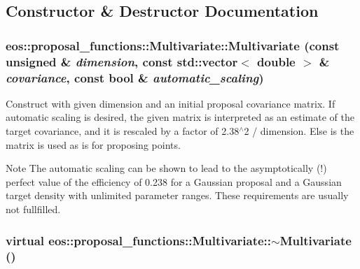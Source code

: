 \subsection{Constructor \& Destructor Documentation}
\hypertarget{classeos_1_1proposal__functions_1_1Multivariate_a0f3a2171c1b20ef0f4cb4588185981aa}{
\subsubsection[{Multivariate}]{\setlength{\rightskip}{0pt plus 5cm}eos::proposal\_\-functions::Multivariate::Multivariate (const unsigned \& {\em dimension}, \/  const std::vector$<$ double $>$ \& {\em covariance}, \/  const bool \& {\em automatic\_\-scaling})}}
\label{classeos_1_1proposal__functions_1_1Multivariate_a0f3a2171c1b20ef0f4cb4588185981aa}
Construct with given dimension and an initial proposal covariance matrix. If automatic scaling is desired, the given matrix is interpreted as an estimate of the target covariance, and it is rescaled by a factor of 2.38$^\wedge$2 / dimension. Else is the matrix is used as is for proposing points.

\begin{DoxyNote}{Note}
The automatic scaling can be shown to lead to the asymptotically (!) perfect value of the efficiency of 0.238 for a Gaussian proposal and a Gaussian target density with unlimited parameter ranges. These requirements are usually not fullfilled. 
\end{DoxyNote}
\hypertarget{classeos_1_1proposal__functions_1_1Multivariate_a2b216d8b68102068c721f758d562485d}{
\subsubsection[{$\sim$Multivariate}]{\setlength{\rightskip}{0pt plus 5cm}virtual eos::proposal\_\-functions::Multivariate::$\sim$Multivariate ()}}
\label{classeos_1_1proposal__functions_1_1Multivariate_a2b216d8b68102068c721f758d562485d}


